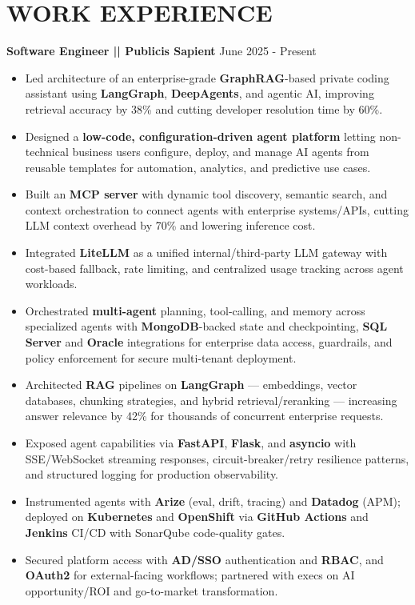 \documentclass[a4paper]{article}
\begin{document}
\section*{WORK EXPERIENCE}
\textbf{Software Engineer || Publicis Sapient}
\hfill June 2025 - Present
\begin{itemize}
\vspace{1pt}
\item {Led architecture of an enterprise-grade \textbf{GraphRAG}-based private coding assistant using \textbf{LangGraph}, \textbf{DeepAgents}, and agentic AI, improving retrieval accuracy by 38\% and cutting developer resolution time by 60\%.}
\item {Designed a \textbf{low-code, configuration-driven agent platform} letting non-technical business users configure, deploy, and manage AI agents from reusable templates for automation, analytics, and predictive use cases.}
\item {Built an \textbf{MCP server} with dynamic tool discovery, semantic search, and context orchestration to connect agents with enterprise systems/APIs, cutting LLM context overhead by 70\% and lowering inference cost.}
\item {Integrated \textbf{LiteLLM} as a unified internal/third-party LLM gateway with cost-based fallback, rate limiting, and centralized usage tracking across agent workloads.}
\item {Orchestrated \textbf{multi-agent} planning, tool-calling, and memory across specialized agents with \textbf{MongoDB}-backed state and checkpointing, \textbf{SQL Server} and \textbf{Oracle} integrations for enterprise data access, guardrails, and policy enforcement for secure multi-tenant deployment.}
\item {Architected \textbf{RAG} pipelines on \textbf{LangGraph} — embeddings, vector databases, chunking strategies, and hybrid retrieval/reranking — increasing answer relevance by 42\% for thousands of concurrent enterprise requests.}
\item {Exposed agent capabilities via \textbf{FastAPI}, \textbf{Flask}, and \textbf{asyncio} with SSE/WebSocket streaming responses, circuit-breaker/retry resilience patterns, and structured logging for production observability.}
\item {Instrumented agents with \textbf{Arize} (eval, drift, tracing) and \textbf{Datadog} (APM); deployed on \textbf{Kubernetes} and \textbf{OpenShift} via \textbf{GitHub Actions} and \textbf{Jenkins} CI/CD with SonarQube code-quality gates.}
\item {Secured platform access with \textbf{AD/SSO} authentication and \textbf{RBAC}, and \textbf{OAuth2} for external-facing workflows; partnered with execs on AI opportunity/ROI and go-to-market transformation.}

\end{itemize}
\end{document}
